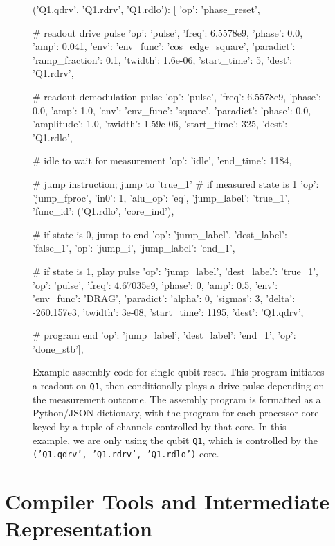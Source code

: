 \documentclass[journal]{IEEEtran}
\begin{document}
\begin{figure}
\begin{python}
{('Q1.qdrv', 'Q1.rdrv', 'Q1.rdlo'): [
  {'op': 'phase_reset'},

  # readout drive pulse
  {'op': 'pulse', 'freq': 6.5578e9, 'phase': 0.0,
   'amp': 0.041, 
   'env': {
        'env_func': 'cos_edge_square',
           'paradict': {
                'ramp_fraction': 0.1, 
                'twidth': 1.6e-06}},
   'start_time': 5, 'dest': 'Q1.rdrv'},
   
  # readout demodulation pulse
  {'op': 'pulse', 'freq': 6.5578e9, 'phase': 0.0,
   'amp': 1.0,
   'env': {
        'env_func': 'square',
            'paradict': {
                'phase': 0.0, 'amplitude': 1.0, 
                'twidth': 1.59e-06}},
   'start_time': 325, 'dest': 'Q1.rdlo'},

  # idle to wait for measurement
  {'op': 'idle', 'end_time': 1184},

  # jump instruction; jump to 'true_1' 
  # if measured state is 1
  {'op': 'jump_fproc',
   'in0': 1,
   'alu_op': 'eq',
   'jump_label': 'true_1',
   'func_id': ('Q1.rdlo', 'core_ind')},

  # if state is 0, jump to end
  {'op': 'jump_label', 'dest_label': 'false_1'},
  {'op': 'jump_i', 'jump_label': 'end_1'},

  # if state is 1, play pulse
  {'op': 'jump_label', 'dest_label': 'true_1'},
  {'op': 'pulse',
   'freq': 4.67035e9, 'phase': 0, 'amp': 0.5,
   'env': {
        'env_func': 'DRAG',
        'paradict': {
            'alpha': 0,
            'sigmas': 3,
            'delta': -260.157e3,
        'twidth': 3e-08}},
   'start_time': 1195, 'dest': 'Q1.qdrv'},

  # program end
  {'op': 'jump_label', 'dest_label': 'end_1'},
  {'op': 'done_stb'}],
}
\end{python}
\caption{Example assembly code for single-qubit reset. This program initiates a readout on \texttt{Q1}, then conditionally plays a drive pulse depending on the measurement outcome. The assembly program is formatted as a Python/JSON dictionary, with the program for each processor core keyed by a tuple of channels controlled by that core. In this example, we are only using the qubit \texttt{Q1}, which is controlled by the \texttt{('Q1.qdrv', 'Q1.rdrv', 'Q1.rdlo')} core.}
\label{fig:asm_reset}
\end{figure}


\section{Compiler Tools and Intermediate Representation}
\end{document}
